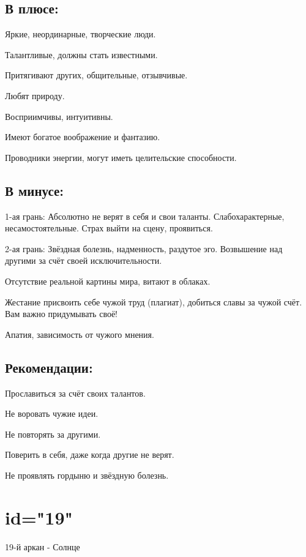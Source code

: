 \subsection{В плюсе:}
\item Яркие, неординарные, творческие люди.
\item Талантливые, должны стать известными.
\item Притягивают других, общительные, отзывчивые.
\item Любят природу.
\item Восприимчивы, интуитивны.
\item Имеют богатое воображение и фантазию.
\item Проводники энергии, могут иметь целительские способности.
\endsubsection

\subsection{В минусе:}
\item 1-ая грань: Абсолютно не верят в себя и свои таланты. Слабохарактерные, несамостоятельные. Страх выйти на сцену, проявиться.
\item 2-ая грань: Звёздная болезнь, надменность, раздутое эго. Возвышение над другими за счёт своей исключительности.
\item Отсутствие реальной картины мира, витают в облаках.
\item Жестание присвоить себе чужой труд (плагиат), добиться славы за чужой счёт. Вам важно придумывать своё!
\item Апатия, зависимость от чужого мнения.
\endsubsection

\subsection{Рекомендации:}
\item Прославиться за счёт своих талантов.
\item Не воровать чужие идеи.
\item Не повторять за другими.
\item Поверить в себя, даже когда другие не верят.
\item Не проявлять гордыню и звёздную болезнь.
\endsubsection

\endsection

\section{id="19"}{19-й аркан - Солнце}

